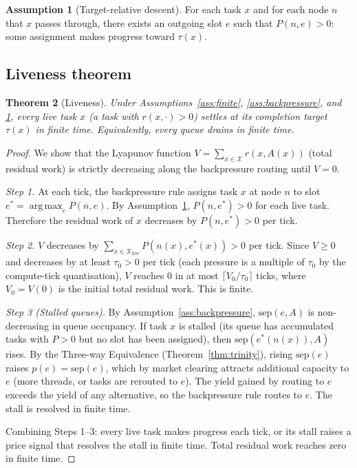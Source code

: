 \documentclass[11pt,twocolumn,a4paper]{article}
\theoremstyle{plain}
\newtheorem{theorem}{Theorem}[section]
\theoremstyle{definition}
\newtheorem{assumption}[theorem]{Assumption}
\theoremstyle{remark}
\newcommand{\X}{\mathcal{X}}
\newcommand{\tick}{\tau_0}
\newcommand{\sep}{\mathrm{sep}}
\newcommand{\pres}{P}
\DeclareMathOperator*{\argmax}{arg\,max}
\begin{document}
\begin{assumption}[Target-relative descent]
\label{ass:descent}
For each task $x$ and for each node $n$ that $x$ passes through, there exists an outgoing slot $e$ such that $\pres(n, e) > 0$: some assignment makes progress toward $\tau(x)$.
\end{assumption}

\subsection{Liveness theorem}

\begin{theorem}[Liveness]
\label{thm:liveness}
Under Assumptions~\ref{ass:finite}, \ref{ass:backpressure}, and \ref{ass:descent}, every live task $x$ (a task with $r(x, \cdot) > 0$) settles at its completion target $\tau(x)$ in finite time. Equivalently, every queue drains in finite time.
\end{theorem}

\begin{proof}
We show that the Lyapunov function $V = \sum_{x \in \X} r(x, A(x))$ (total residual work) is strictly decreasing along the backpressure routing until $V = 0$.

\emph{Step 1.} At each tick, the backpressure rule assigns task $x$ at node $n$ to slot $e^* = \argmax_{e} \pres(n,e)$. By Assumption~\ref{ass:descent}, $\pres(n, e^*) > 0$ for each live task. Therefore the residual work of $x$ decreases by $\pres(n, e^*) > 0$ per tick.

\emph{Step 2.} $V$ decreases by $\sum_{x \in \X_{\mathrm{live}}} \pres(n(x), e^*(x)) > 0$ per tick. Since $V \geq 0$ and decreases by at least $\tick > 0$ per tick (each pressure is a multiple of $\tick$ by the compute-tick quantisation), $V$ reaches $0$ in at most $\lceil V_0 / \tick \rceil$ ticks, where $V_0 = V(0)$ is the initial total residual work. This is finite.

\emph{Step 3 (Stalled queues).} By Assumption~\ref{ass:backpressure}, $\sep(e, A)$ is non-decreasing in queue occupancy. If task $x$ is stalled (its queue has accumulated tasks with $\pres > 0$ but no slot has been assigned), then $\sep(e^*(n(x)), A)$ rises. By the Three-way Equivalence (Theorem~\ref{thm:trinity}), rising $\sep(e)$ raises $p(e) = \sep(e)$, which by market clearing attracts additional capacity to $e$ (more threads, or tasks are rerouted to $e$). The yield gained by routing to $e$ exceeds the yield of any alternative, so the backpressure rule routes to $e$. The stall is resolved in finite time.

Combining Steps 1--3: every live task makes progress each tick, or its stall raises a price signal that resolves the stall in finite time. Total residual work reaches zero in finite time.
\end{proof}
\end{document}
